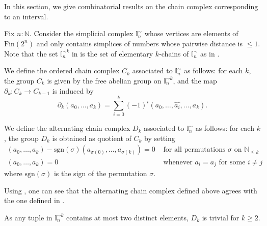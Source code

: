 \label{combinatorialIntervalSection}
In this section, we give combinatorial results on the chain complex corresponding to an interval. 

\begin{remark}
  Fix $n:\mathbb N$. Consider the simplicial complex $\mathbb I_n^\sim$ whose vertices are elements of $\mathrm{Fin}(2^n)$ and only contains simplices of numbers whose pairwise distance is $\leq 1$. 
  Note that the set $\mathbb I_n^{\sim k}$ in  is the set of elementary $k$-chains of $\mathbb I_n^\sim$ as in \parencite[Def VI.2.1]{EilenbergSteenrod}.
\end{remark}   

\begin{definition}{\cite[Def VI.2.3]{EilenbergSteenrod}}
  We define the ordered chain complex $C_k$ associated to $\mathbb I_n^{\sim}$ as follows: for each $k$, the group $C_k$ is given by the free abelian group on $\mathbb I_n^{\sim k}$, and the map $\partial_k: C_k\to C_{k-1}$ is induced by 
  $$\partial_k(a_0,\hdots , a_k) = \sum\limits_{i=0}^k (-1)^i(a_0,\hdots, \widehat{a_i},\hdots, a_k).$$

  We define the alternating chain complex $D_k$ associated to $\mathbb I_n^\sim$ as follows: for each $k$, the group $D_k$ is obtained as quotient of $C_k$ by setting
  \begin{align*}
    (a_0, \hdots, a_k) - \mathrm{sgn}(\sigma) (a_{\sigma(0)} , \hdots, a_{\sigma(k)})=0 &\text{ for all permutations } \sigma \text{ on } \mathbb N_{\leq k} \\
    (a_0, \hdots, a_k) = 0 &\text{ whenever } a_i = a_j \text{ for some } i\neq j
  \end{align*}
  where $\mathrm{sgn}(\sigma)$ is the sign of the permutation $\sigma$.
\end{definition}

Using \cite[Lemmas VI.6.5 and VI.6.6]{EilenbergSteenrod}, one can see that the alternating chain complex defined above agrees with the one defined in \cite[Def VI.6.8]{EilenbergSteenrod}.

\begin{remark}\label{RmkTrivialDk}
As any tuple in $\mathbb I_n^{\sim k}$ contains at most two distinct elements, $D_k$ is trivial for $k\geq 2$. 
\end{remark}


